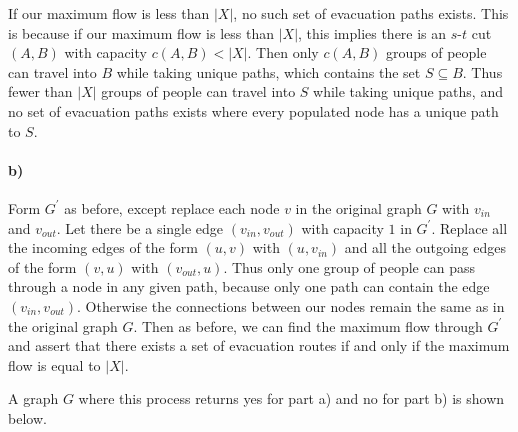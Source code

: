 \documentclass[12pt]{article}
\begin{document}
If our maximum flow is less than \(|X|\), no such set of evacuation paths exists. This is because if our maximum flow is less than \(|X|\), this implies there
is an \(s\)-\(t\) cut \((A,B)\) with capacity \(c(A,B)<|X|\). Then only \(c(A,B)\) groups of people can travel into \(B\) while taking unique paths, which
contains the set \(S\subseteq B\). Thus fewer than \(|X|\) groups of people can travel into \(S\) while taking unique paths, and no set of evacuation paths exists where
every populated node has a unique path to \(S\).

\paragraph{b)}

Form \(G^\prime\) as before, except replace each node \(v\) in the original graph \(G\) with \(v_{in}\) and \(v_{out}\). Let there be a single edge \((v_{in},v_{out})\)
with capacity \(1\) in \(G^\prime\). Replace all the incoming edges of the form \((u,v)\) with \((u,v_{in})\) and all the outgoing edges of the form \((v,u)\) with \((v_{out},u)\).
Thus only one group of people can pass through a node in any given path, because only one path can contain the edge \((v_{in},v_{out})\). Otherwise the connections between
our nodes remain the same as in the original graph \(G\). Then as before, we can find the maximum flow through \(G^\prime\) and assert that there exists a set of evacuation routes if and only if the maximum flow is equal to \(|X|\).

A graph \(G\) where this process returns yes for part a) and no for part b) is shown below.
\end{document}
